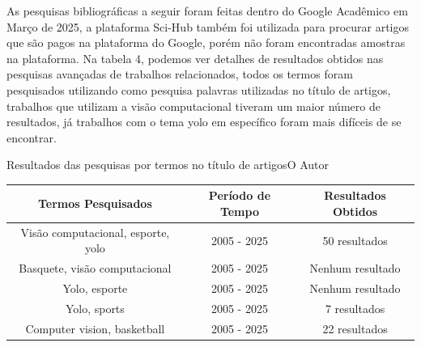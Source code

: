 \vspace{0.5 cm}

As pesquisas bibliográficas a seguir foram feitas dentro do Google Acadêmico em Março de 2025, 
a plataforma Sci-Hub também foi utilizada para procurar artigos que são pagos na plataforma do Google, 
porém não foram encontradas amostras na plataforma. Na tabela 4, podemos ver detalhes de resultados obtidos nas pesquisas avançadas de trabalhos relacionados, 
todos os termos foram pesquisados utilizando como pesquisa palavras utilizadas no título de artigos, trabalhos que utilizam a visão computacional tiveram um maior número de resultados, já trabalhos com o tema \ac{yolo} em específico foram mais difíceis de se encontrar.

\begin{tabela}{Resultados das pesquisas por termos no título de artigos}{O Autor}
\label{tab:resultados-pesquisa}
\begin{tabular}{|c|c|c|}
\hline
\textbf{Termos Pesquisados} & \textbf{Período de Tempo} & \textbf{Resultados Obtidos} \\
\hline
Visão computacional, esporte, yolo & 2005 - 2025 & 50 resultados \\
Basquete, visão computacional       & 2005 - 2025 & Nenhum resultado \\
Yolo, esporte                       & 2005 - 2025 & Nenhum resultado \\
Yolo, sports                        & 2005 - 2025 & 7 resultados \\
Computer vision, basketball         & 2005 - 2025 & 22 resultados \\
\hline
\end{tabular}
\end{tabela}
\vspace{0.5cm}



